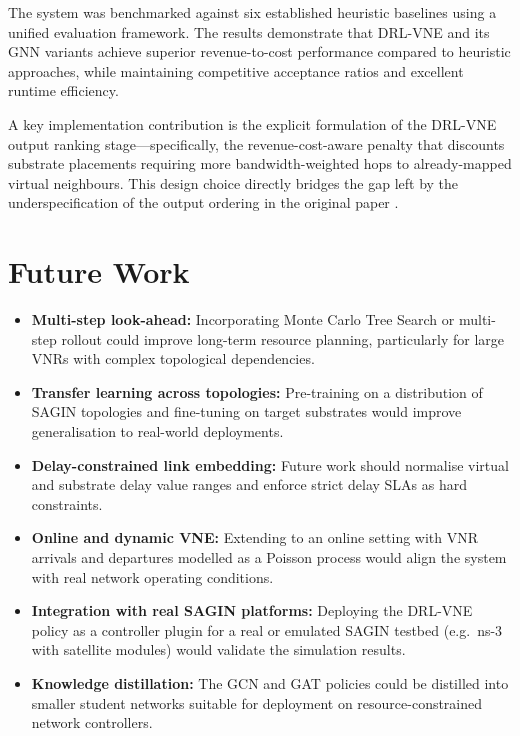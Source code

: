 \documentclass[12pt,a4paper]{report}
\begin{document}
The system was benchmarked against six established heuristic baselines using a unified
evaluation framework. The results demonstrate that DRL-VNE and its GNN variants achieve
superior revenue-to-cost performance compared to heuristic approaches, while maintaining
competitive acceptance ratios and excellent runtime efficiency.

A key implementation contribution is the explicit formulation of the DRL-VNE output ranking
stage---specifically, the revenue-cost-aware penalty that discounts substrate placements
requiring more bandwidth-weighted hops to already-mapped virtual neighbours. This design choice
directly bridges the gap left by the underspecification of the output ordering in the original
paper \cite{zhang2022drl}.

\section{Future Work}

\begin{itemize}[leftmargin=*]
  \item \textbf{Multi-step look-ahead:} Incorporating Monte Carlo Tree Search or multi-step
        rollout could improve long-term resource planning, particularly for large VNRs with
        complex topological dependencies.

  \item \textbf{Transfer learning across topologies:} Pre-training on a distribution of SAGIN
        topologies and fine-tuning on target substrates would improve generalisation to
        real-world deployments.

  \item \textbf{Delay-constrained link embedding:} Future work should normalise virtual and
        substrate delay value ranges and enforce strict delay SLAs as hard constraints.

  \item \textbf{Online and dynamic VNE:} Extending to an online setting with VNR arrivals and
        departures modelled as a Poisson process would align the system with real network
        operating conditions.

  \item \textbf{Integration with real SAGIN platforms:} Deploying the DRL-VNE policy as a
        controller plugin for a real or emulated SAGIN testbed (e.g.\ ns-3 with satellite
        modules) would validate the simulation results.

  \item \textbf{Knowledge distillation:} The GCN and GAT policies could be distilled into
        smaller student networks suitable for deployment on resource-constrained network
        controllers.
\end{itemize}
\end{document}
